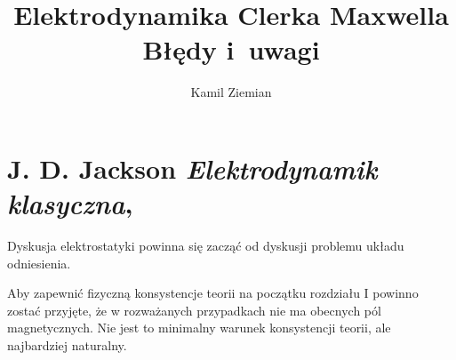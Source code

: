 \documentclass[a4paper,11pt]{article}
\title{Elektrodynamika Clerka Maxwella \\
  {\Large Błędy i~uwagi}}
\author{Kamil Ziemian}
\numberwithin{equation}{section}
\begin{document}





\maketitle










\section{J. D. Jackson \textit{Elektrodynamik klasyczna},
  \parencite{JacksonElektrodynamikaKlasyczna1987}}


\vspace{0em}



\vspace{0em}


\noindent
Dyskusja elektrostatyki powinna się zacząć od dyskusji problemu układu
odniesienia.

\VerSpaceFour





\noindent
Aby zapewnić fizyczną konsystencje teorii na początku rozdziału I
powinno zostać przyjęte, że w rozważanych przypadkach nie ma obecnych
pól magnetycznych. Nie jest to minimalny warunek konsystencji teorii,
ale najbardziej naturalny.

\VerSpaceFour




\end{document}
